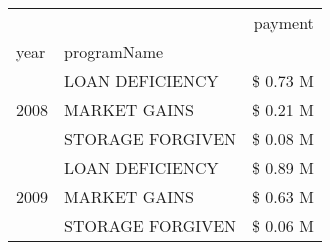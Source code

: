 \begin{tabular}{llr}
\toprule
 &  & payment \\
year & programName &  \\
\midrule
\multirow[t]{3}{*}{2008} & LOAN DEFICIENCY & \$ 0.73 M \\
 & MARKET GAINS & \$ 0.21 M \\
 & STORAGE FORGIVEN & \$ 0.08 M \\
\cline{1-3}
\multirow[t]{3}{*}{2009} & LOAN DEFICIENCY & \$ 0.89 M \\
 & MARKET GAINS & \$ 0.63 M \\
 & STORAGE FORGIVEN & \$ 0.06 M \\
\cline{1-3}
\bottomrule
\end{tabular}
